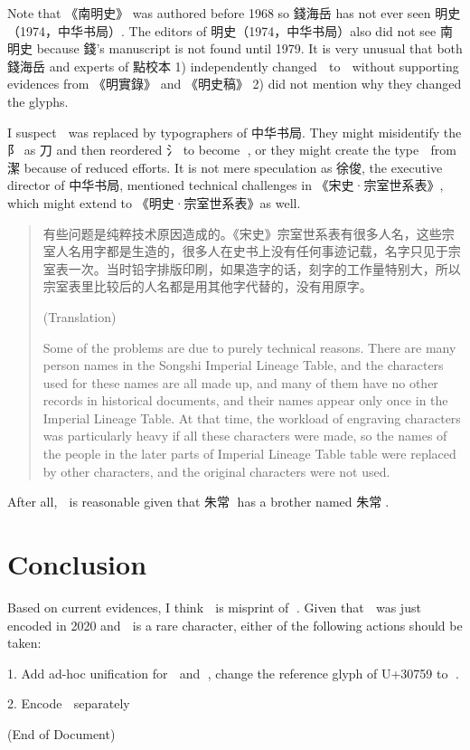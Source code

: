 \documentclass{article}
\begin{document}
Note that 《南明史》 was authored before 1968 so 錢海岳 has not ever seen 明史（1974，中华书局）. The editors of 明史（1974，中华书局）also did not see 南明史 because 錢's manuscript is not found until 1979\cite{南明史}. It is very unusual that both 錢海岳 and experts of 點校本 1) independently changed 﫠 to 𰝙 without supporting evidences from 《明實錄》 and 《明史稿》 2) did not mention why they changed the glyphs.

I suspect 﫠 was replaced by typographers of 中华书局. They might misidentify the 阝 as 刀 and then reordered 氵 to become 𰝙, or they might create the type 𰝙 from 潔 because of reduced efforts. It is not mere speculation as 徐俊, the executive director of 中华书局, mentioned \cite{徐俊谈点校本二十四史的修订} technical challenges in 《宋史·宗室世系表》, which might extend to 《明史·宗室世系表》as well.

\begin{quotation}
    有些问题是纯粹技术原因造成的。《宋史》宗室世系表有很多人名，这些宗室人名用字都是生造的，很多人在史书上没有任何事迹记载，名字只见于宗室表一次。当时铅字排版印刷，如果造字的话，刻字的工作量特别大，所以宗室表里比较后的人名都是用其他字代替的，没有用原字。

    (Translation)
    
    Some of the problems are due to purely technical reasons. There are many person names in the Songshi Imperial Lineage Table, and the characters used for these names are all made up, and many of them have no other records in historical documents, and their names appear only once in the Imperial Lineage Table. At that time, the workload of engraving characters was particularly heavy if all these characters were made, so the names of the people in the later parts of Imperial Lineage Table table were replaced by other characters, and the original characters were not used.
\end{quotation}

After all, 﫠 is reasonable given that 朱常﫠 has a brother named 朱常𰍠\cite{明史德王府世系表訂誤}.

\section{Conclusion}

Based on current evidences, I think 𰝙 is misprint of 﫠. Given that 𰝙 was just encoded in 2020 and 𰝙 is a rare character, either of the following actions should be taken:

1. Add ad-hoc unification for 﫠 and 𰝙, change the reference glyph of U+30759 to 﫠. 

2. Encode 﫠 separately

{}


\vfill
(End of Document)
\end{document}
